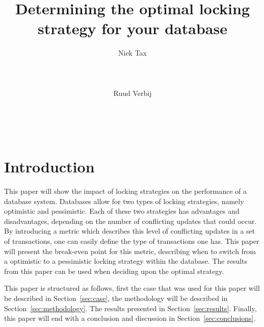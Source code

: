 \documentclass{sig-alternate-br}
\begin{document}

\title{Determining the optimal locking strategy for your database}

\author{
\alignauthor Niek Tax\\
       \\
       \\
       \\
\alignauthor Ruud Verbij\\
       \\
       \\
       \\
}

\maketitle
\begin{abstract}
\end{abstract}


\section{Introduction}
\label{sec:intro}
This paper will show the impact of locking strategies on the performance of a database system. Databases allow for two types of locking strategies, namely optimistic and pessimistic. Each of these two strategies has advantages and disadvantages, depending on the number of conflicting updates that could occur. By introducing a metric which describes this level of conflicting updates in a set of transactions, one can easily define the type of transactions one has. This paper will present the break-even point for this metric, describing when to switch from a optimistic to a pessimistic locking strategy within the database. The results from this paper can be used when deciding upon the optimal strategy.

This paper is structured as follows, first the case that was used for this paper will be described in Section~\ref{sec:case}, the methodology will be described in Section~\ref{sec:methodology}. The results presented in Section~\ref{sec:results}. Finally, this paper will end with a conclusion and discussion in Section~\ref{sec:conclusions}.
\end{document}
